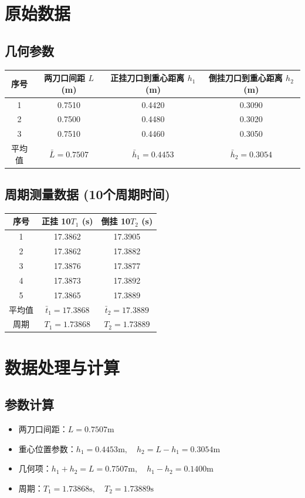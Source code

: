 \documentclass[12pt,a4paper]{article}
\begin{document}
\section{原始数据}
\subsection*{几何参数}
\begin{center}
\begin{tabular}{cccc}
	\toprule
    序号 & 两刀口间距 $L$ (m) & 正挂刀口到重心距离 $h_1$ (m) & 倒挂刀口到重心距离 $h_2$ (m) \\
    \midrule
	1 & 0.7510 & 0.4420 & 0.3090 \\
	2 & 0.7500 & 0.4480 & 0.3020 \\
	3 & 0.7510 & 0.4460 & 0.3050 \\
    \midrule
    平均值 & $\bar{L} = 0.7507$ & $\bar{h}_1 = 0.4453$ & $\bar{h}_2 = 0.3054$ \\
    \bottomrule
\end{tabular}
\end{center}
\subsection*{周期测量数据 (10个周期时间)}
\begin{center}
\begin{tabular}{ccc}
\toprule
序号 & 正挂 10$T_1$ (s) & 倒挂 10$T_2$ (s) \\
\midrule
1  & 17.3862 & 17.3905 \\
2  & 17.3862 & 17.3882 \\
3  & 17.3876 & 17.3877 \\
4  & 17.3873 & 17.3892 \\
5  & 17.3865 & 17.3889 \\
\midrule
平均值 & $\bar{t}_1 = 17.3868$ & $\bar{t}_2 = 17.3889$ \\
周期 & $T_1 = 1.73868$ & $T_2 = 1.73889$ \\
\bottomrule
\end{tabular}
\end{center}


\section{数据处理与计算}
\subsection*{参数计算}
\begin{itemize}
    \item 两刀口间距：$L = 0.7507 \text{m}$
    \item 重心位置参数：$h_1 = 0.4453 \text{m}, \quad h_2 = L - h_1 = 0.3054 \text{m}$
    \item 几何项：$h_1 + h_2 = L = 0.7507 \text{m}, \quad h_1 - h_2 = 0.1400 \text{m}$
    \item 周期：$T_1 = 1.73868 \text{s}, \quad T_2 = 1.73889 \text{s}$
\end{itemize}
\end{document}

